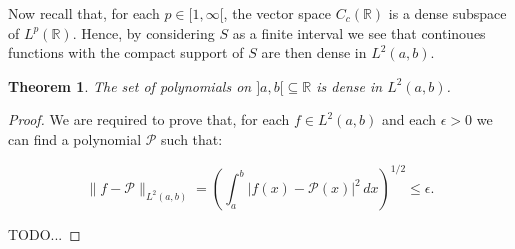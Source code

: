 \documentclass{article}
\newtheorem{thm}{Theorem}[section]
\begin{document}
Now recall that, for each $p\in[1,\infty[$, the vector space $C_c(\mathbb{R})$
is a dense subspace of $L^p(\mathbb{R})$. Hence, by considering
$S$ as a finite interval we see that continoues functions with
the compact support of $S$ are then dense in $L^2(a,b)$.

\begin{thm}
  The set of polynomials on $]a,b[\subseteq\mathbb{R}$ is dense in $L^2(a,b)$.
\end{thm}

\begin{proof}
We are required to prove that, for each $f\in L^2(a,b)$ and each $\epsilon >0$
we can find a polynomial $\mathcal{P}$ such that:

\[
  \| f - \mathcal{P} \|_{L^2(a,b)} = \left( \int_a^b | f(x) - \mathcal{P}(x) |^2 \, dx \right)^{1/2} \leq \epsilon.
\]

TODO...
\end{proof}
\end{document}
